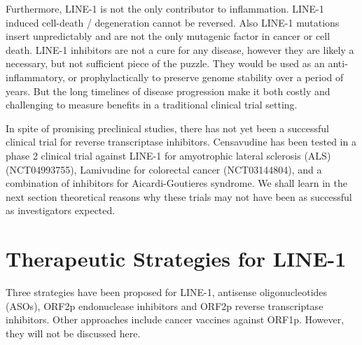 \documentclass[11pt,twocolumn,twoside]{extarticle}
\begin{document}
Furthermore, LINE-1 is not the only contributor to inflammation. LINE-1 induced cell-death / degeneration cannot be reversed. Also LINE-1 mutations insert unpredictably and are not the only mutagenic factor in cancer or cell death. LINE-1 inhibitors are not a cure for any disease, however they are likely a necessary, but not sufficient piece of the puzzle. They would be used as an anti-inflammatory, or prophylactically to preserve genome stability over a period of years. But the long timelines of disease progression make it both costly and challenging to measure benefits in a traditional clinical trial setting.

In spite of promising preclinical studies, there has not yet been a successful clinical trial for reverse transcriptase inhibitors. Censavudine has been tested in a phase 2 clinical trial against LINE-1 for amyotrophic lateral sclerosis (ALS) (NCT04993755), Lamivudine for colorectal cancer (NCT03144804)\cite{rajurkar}, and a combination of inhibitors for Aicardi-Goutieres syndrome\cite{crow}. We shall learn in the next section theoretical reasons why these trials may not have been as successful as investigators expected.

\section{Therapeutic Strategies for LINE-1}
Three strategies have been proposed for LINE-1, antisense oligonucleotides (ASOs), ORF2p endonuclease inhibitors and ORF2p reverse transcriptase inhibitors\cite{dellavalle,dordine,jones,dai}. Other approaches include cancer vaccines against ORF1p\cite{mckerrow}. However, they will not be discussed here.
\end{document}
